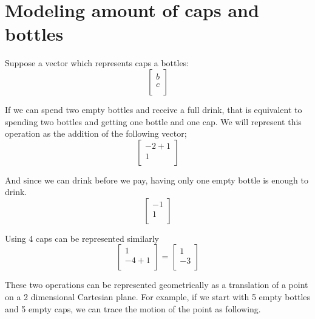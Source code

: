 \documentclass[letterpaper, 12pt]{article}
\begin{document}
\section{Modeling amount of caps and bottles}
Suppose a vector which represents caps a bottles:
\[
    \begin{bmatrix}
        b\\
        c\\
    \end{bmatrix}
\]
\par If we can spend two empty bottles and receive a full drink, that is equivalent to spending two bottles and getting one bottle and one cap.
We will represent this operation as the addition of the following vector;
\[
    \begin{bmatrix}
        -2 + 1\\
        1\\
    \end{bmatrix}
\]
\par And since we can drink before we pay, having only one empty bottle is enough to drink.
\[
    \begin{bmatrix}
        -1\\
        1\\
    \end{bmatrix}
\]
\par Using 4 caps can be represented similarly
\[
    \begin{bmatrix}
        1\\
        -4 + 1\\
    \end{bmatrix}
    =
    \begin{bmatrix}
        1\\
        -3\\
    \end{bmatrix}
\]
\par These two operations can be represented geometrically as a translation of a point on a 2 dimensional Cartesian plane.
For example, if we start with 5 empty bottles and 5 empty caps, we can trace the motion of the point as following.
\end{document}
